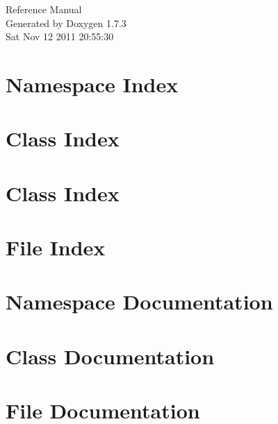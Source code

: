 \documentclass[a4paper]{book}
\begin{document}
\hypersetup{pageanchor=false}
\begin{titlepage}
\vspace*{7cm}
\begin{center}
{\Large Reference Manual}\\
\vspace*{1cm}
{\large Generated by Doxygen 1.7.3}\\
\vspace*{0.5cm}
{\small Sat Nov 12 2011 20:55:30}\\
\end{center}
\end{titlepage}
\clearemptydoublepage
{}
\tableofcontents
\clearemptydoublepage
{}
\hypersetup{pageanchor=true}
\chapter{Namespace Index}

\chapter{Class Index}

\chapter{Class Index}

\chapter{File Index}

\chapter{Namespace Documentation}

\chapter{Class Documentation}















\chapter{File Documentation}

















\printindex
\end{document}
